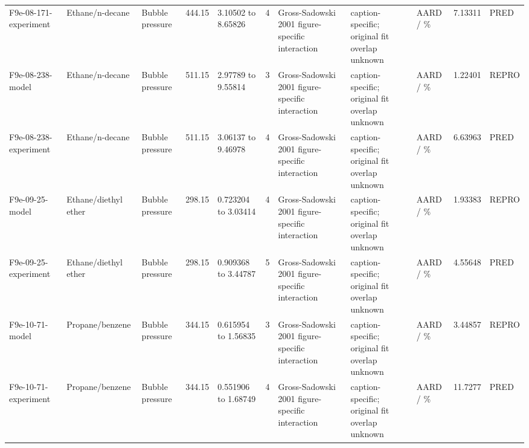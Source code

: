 \begin{landscape}
\begin{longtable}{L{1.9cm}L{2.5cm}L{2.1cm}L{1.6cm}L{1.6cm}rL{2.4cm}L{1.9cm}L{2.2cm}rL{1cm}}
F9e-\allowbreak{}08-\allowbreak{}171-\allowbreak{}experiment & Ethane/\allowbreak{}n-\allowbreak{}decane & Bubble pressure & 444.15 & 3.10502 to 8.65826 & 4 & Gross-\allowbreak{}Sadowski 2001 figure-\allowbreak{}specific interaction & caption-\allowbreak{}specific; original fit overlap unknown & AARD /\allowbreak{} \% & 7.13311 & PRED \\
F9e-\allowbreak{}08-\allowbreak{}238-\allowbreak{}model & Ethane/\allowbreak{}n-\allowbreak{}decane & Bubble pressure & 511.15 & 2.97789 to 9.55814 & 3 & Gross-\allowbreak{}Sadowski 2001 figure-\allowbreak{}specific interaction & caption-\allowbreak{}specific; original fit overlap unknown & AARD /\allowbreak{} \% & 1.22401 & REPRO \\
F9e-\allowbreak{}08-\allowbreak{}238-\allowbreak{}experiment & Ethane/\allowbreak{}n-\allowbreak{}decane & Bubble pressure & 511.15 & 3.06137 to 9.46978 & 4 & Gross-\allowbreak{}Sadowski 2001 figure-\allowbreak{}specific interaction & caption-\allowbreak{}specific; original fit overlap unknown & AARD /\allowbreak{} \% & 6.63963 & PRED \\
F9e-\allowbreak{}09-\allowbreak{}25-\allowbreak{}model & Ethane/\allowbreak{}diethyl ether & Bubble pressure & 298.15 & 0.723204 to 3.03414 & 4 & Gross-\allowbreak{}Sadowski 2001 figure-\allowbreak{}specific interaction & caption-\allowbreak{}specific; original fit overlap unknown & AARD /\allowbreak{} \% & 1.93383 & REPRO \\
F9e-\allowbreak{}09-\allowbreak{}25-\allowbreak{}experiment & Ethane/\allowbreak{}diethyl ether & Bubble pressure & 298.15 & 0.909368 to 3.44787 & 5 & Gross-\allowbreak{}Sadowski 2001 figure-\allowbreak{}specific interaction & caption-\allowbreak{}specific; original fit overlap unknown & AARD /\allowbreak{} \% & 4.55648 & PRED \\
F9e-\allowbreak{}10-\allowbreak{}71-\allowbreak{}model & Propane/\allowbreak{}benzene & Bubble pressure & 344.15 & 0.615954 to 1.56835 & 3 & Gross-\allowbreak{}Sadowski 2001 figure-\allowbreak{}specific interaction & caption-\allowbreak{}specific; original fit overlap unknown & AARD /\allowbreak{} \% & 3.44857 & REPRO \\
F9e-\allowbreak{}10-\allowbreak{}71-\allowbreak{}experiment & Propane/\allowbreak{}benzene & Bubble pressure & 344.15 & 0.551906 to 1.68749 & 4 & Gross-\allowbreak{}Sadowski 2001 figure-\allowbreak{}specific interaction & caption-\allowbreak{}specific; original fit overlap unknown & AARD /\allowbreak{} \% & 11.7277 & PRED \\

\end{longtable}
\end{landscape}
